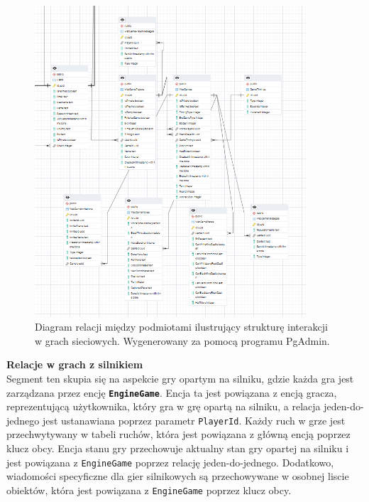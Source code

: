 \documentclass[12pt,a4paper]{article}
\begin{document}
\vspace{1cm}
\begin{figure}[h!]
    \centering
    \includegraphics[width=0.9\textwidth]{images/ERD_online.png}
    \caption{Diagram relacji między podmiotami ilustrujący strukturę interakcji w grach sieciowych. Wygenerowany za pomocą programu PgAdmin.}
\end{figure}

\newpage

\noindent \textbf{Relacje w grach z silnikiem}\\
Segment ten skupia się na aspekcie gry opartym na silniku, gdzie każda gra jest zarządzana przez encję \textbf{\texttt{EngineGame}}. Encja ta jest powiązana z encją gracza, reprezentującą użytkownika, który gra w grę opartą na silniku, a relacja jeden-do-jednego jest ustanawiana poprzez parametr \texttt{PlayerId}. Każdy ruch w grze jest przechwytywany w tabeli ruchów, która jest powiązana z główną encją poprzez klucz obcy. Encja stanu gry przechowuje aktualny stan gry opartej na silniku i jest powiązana z \texttt{EngineGame} poprzez relację jeden-do-jednego. Dodatkowo, wiadomości specyficzne dla gier silnikowych są przechowywane w osobnej liscie obiektów, która jest powiązana z \texttt{EngineGame} poprzez klucz obcy.
\end{document}
